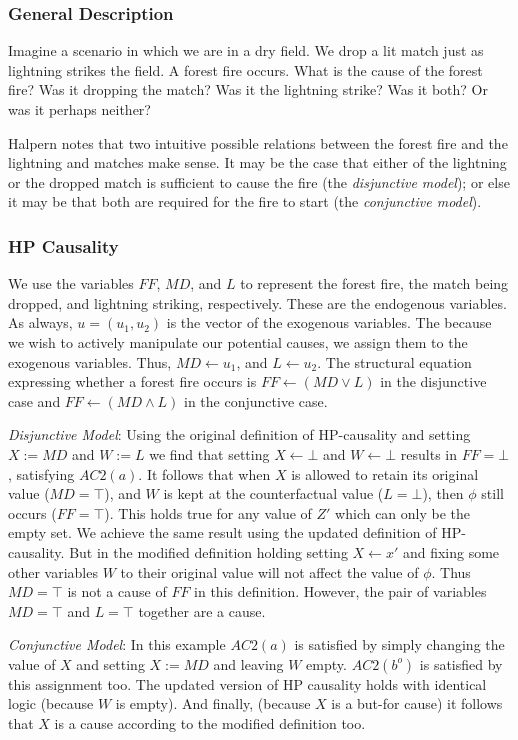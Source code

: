 \documentclass{article}
\theoremstyle{plain}
\theoremstyle{definition}
\begin{document}
\subsubsection*{General Description}
Imagine a scenario in which we are in a dry field. We drop a lit match just as lightning strikes the field. A forest fire occurs. What is the cause of the forest fire? Was it dropping the match? Was it the lightning strike? Was it both? Or was it perhaps neither?

Halpern notes that two intuitive possible relations between the forest fire and the lightning and matches make sense. It may be the case that either of the lightning or the dropped match is sufficient to cause the fire (the \textit{disjunctive model}); or else it may be that both are required for the fire to start (the \textit{conjunctive model}).

\subsubsection*{HP Causality}
We use the variables $FF$, $MD$, and $L$ to represent the forest fire, the match being dropped, and lightning striking, respectively. These are the endogenous variables. As always, $u=(u_1, u_2)$ is the vector of the exogenous variables. The because we wish to actively manipulate our potential causes, we assign them to the exogenous variables. Thus, $MD \leftarrow u_1$, and $L \leftarrow u_2$. The structural equation expressing whether a forest fire occurs is $FF\leftarrow(MD \lor L)$ in the disjunctive case and $FF \leftarrow (MD \land L)$ in the conjunctive case.

\textit{Disjunctive Model}: Using the original definition of HP-causality and setting $X:=MD$ and $W:=L$ we find that setting $X \leftarrow \bot$ and $W \leftarrow \bot$ results in $FF=\bot$, satisfying $AC2(a)$. It follows that when $X$  is allowed to retain its original value ($MD=\top$), and $W$ is kept at the counterfactual value ($L=\bot$), then $\phi$ still occurs ($FF=\top$). This holds true for any value of $Z'$ which can only be the empty set. We achieve the same result using the updated definition of HP-causality. But in the modified definition holding setting $X \leftarrow x'$ and fixing some other variables $W$ to their original value will not affect the value of $\phi$. Thus $MD=\top$ is not a cause of $FF$ in this definition. However, the pair of variables $MD=\top$ and $L=\top$ together are a cause.

\textit{Conjunctive Model}: In this example $AC2(a)$ is satisfied by simply changing the value of $X$ and setting $X:=MD$ and leaving $W$ empty. $AC2(b^o)$ is satisfied by this assignment too. The updated version of HP causality holds with identical logic (because $W$ is empty). And finally, (because $X$ is a but-for cause) it follows that $X$ is a cause according to the modified definition too.
\end{document}

